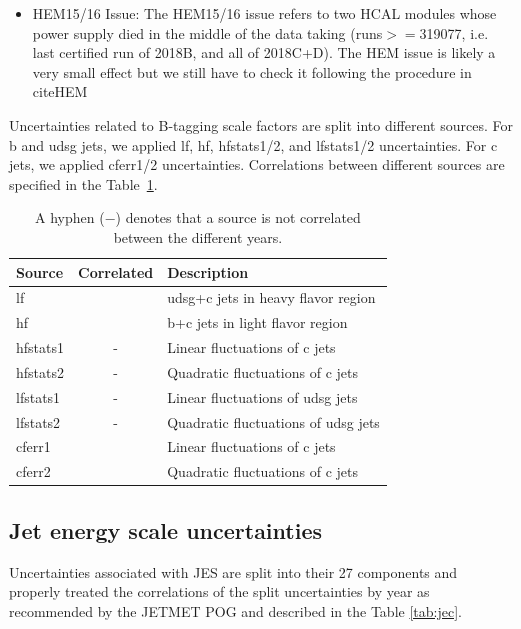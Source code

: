 \begin{itemize}
\item HEM15/16 Issue: The HEM15/16 issue refers to two HCAL modules whose power supply died in 
the middle of the data taking (runs$>=$319077, i.e. last certified run of 
2018B, and all of 2018C+D). The HEM issue is likely a very small effect but we still have to check it following the procedure in cite{HEM}
\end{itemize}

Uncertainties related to B-tagging scale factors are split into different sources. For b and udsg jets, we applied lf, hf, hfstats1/2, and lfstats1/2 uncertainties. For c jets, we applied cferr1/2 uncertainties. Correlations between different sources are specified in the Table~\ref{tab:btag}.

\begin{table}[!hbtp]
\label{tab:btag}
\sffamily
\begin{center}
\caption{
A hyphen ($-$) denotes that a source is not correlated between the different years.
}
\begin{tabular}{lcl}
\toprule
Source & Correlated & Description\\
\midrule
lf			& \checkmark & udsg+c jets in heavy flavor region\\ %
hf			& \checkmark & b+c jets in light flavor region \\ %
hfstats1	& - 		 & Linear fluctuations of c jets\\
hfstats2	& -			 & Quadratic fluctuations of c jets \\
lfstats1	& -			 & Linear fluctuations of udsg jets \\
lfstats2	& -			 & Quadratic fluctuations of udsg jets \\
cferr1		& \checkmark & Linear fluctuations of c jets \\
cferr2		& \checkmark & Quadratic fluctuations of c jets \\
\bottomrule
\end{tabular}
\end{center}
\end{table}

\subsection{Jet energy scale uncertainties}

Uncertainties associated with JES are split into their 27 components and properly treated the correlations of the split uncertainties by year as recommended by the JETMET POG and described in the Table \ref{tab:jec}.

